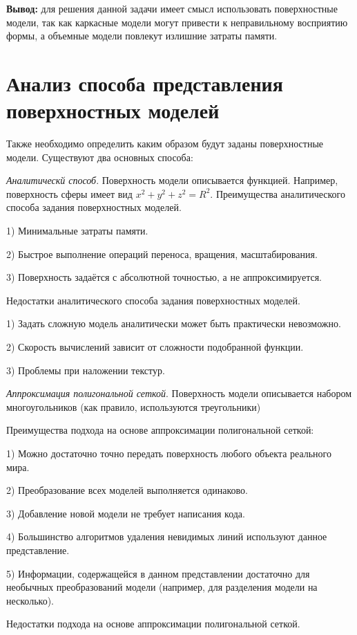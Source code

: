 	\textbf{Вывод:} для решения данной задачи имеет смысл использовать поверхностные модели, так как каркасные модели могут привести к неправильному восприятию формы, а объемные модели повлекут излишние затраты памяти.
	
	\section{Анализ способа представления поверхностных моделей}
	
	Также необходимо определить каким образом будут заданы поверхностные модели. Существуют два основных способа:
	 
	\textit{Аналитическй способ}. Поверхность модели описывается функцией. Например, поверхность сферы имеет вид $x^2 + y^2 + z^2 = R^2.$
	Преимущества аналитического способа задания поверхностных моделей.
	
	1) Минимальные затраты памяти.
	
	2) Быстрое выполнение операций переноса, вращения, масштабирования.
	
	3) Поверхность задаётся с абсолютной точностью, а не аппроксимируется.
	
	Недостатки аналитического способа задания поверхностных моделей.
	
	1) Задать сложную модель аналитически может быть практически невозможно.
	
	2) Скорость вычислений зависит от сложности подобранной функции.
	
	3) Проблемы при наложении текстур.
	
	\textit{Аппроксимация полигональной сеткой}. Поверхность модели описывается набором многоугольников (как правило, используются треугольники)
	
	Преимущества подхода на основе аппроксимации полигональной сеткой:
	
	1) Можно достаточно точно передать поверхность любого объекта реального мира.
	
	2) Преобразование всех моделей выполняется одинаково.
	
	3) Добавление новой модели не требует написания кода.
	
	4) Большинство алгоритмов удаления невидимых линий используют данное представление.
	
	5) Информации, содержащейся в данном представлении достаточно для необычных преобразований модели (например, для разделения модели на несколько).
	
	Недостатки подхода на основе аппроксимации полигональной сеткой.
	
